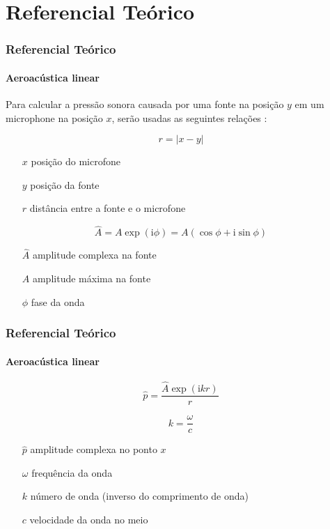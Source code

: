 \documentclass[aspectratio=169]{beamer}
\newcommand{\iu}{\mathrm{i}}
\begin{document}
\section{Referencial Teórico}
\begin{frame}
\frametitle{Referencial Teórico}
\framesubtitle{Aeroacústica linear}

Para calcular a pressão sonora
causada por uma fonte na posição $y$
em um microphone na posição $x$,
serão usadas as seguintes relações \cite{Glegg2023-mi}:

\begin{equation}
    r = |x - y|
\end{equation}

\begin{itemize}
    \item[$x$] posição do microfone
    \item[$y$] posição da fonte
    \item[$r$] distância entre a fonte e o microfone
\end{itemize}

\begin{equation}
    \hat{A} = A \exp(\iu \phi) = A (\cos\phi + \iu \sin\phi)
\end{equation}

\begin{itemize}
    \item[$\hat{A}$] amplitude complexa na fonte
    \item[$A$] amplitude máxima na fonte
    \item[$\phi$] fase da onda
\end{itemize}
\end{frame}

\begin{frame}
\frametitle{Referencial Teórico}
\framesubtitle{Aeroacústica linear}

\begin{equation}
    \hat{p} = \frac{\hat{A} \exp (\iu k r)}{r}
\end{equation}

\begin{equation}
    k = \frac{\omega}{c}
\end{equation}

\begin{itemize}
    \item[$\hat{p}$] amplitude complexa no ponto $x$
    \item[$\omega$] frequência da onda
    \item[$k$] número de onda (inverso do comprimento de onda)
    \item[$c$] velocidade da onda no meio
\end{itemize}

\end{frame}
\end{document}

